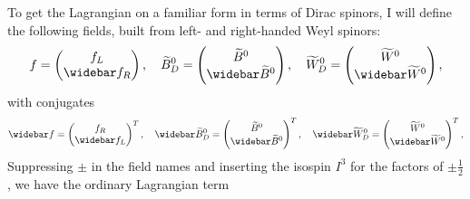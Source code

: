 \documentclass[english, notitlepage]{article}
\begin{document}
            To get the Lagrangian on a familiar form in terms of Dirac spinors, I will
            define the following fields, built from left- and right-handed Weyl spinors:
            \begin{align}
                f = \begin{pmatrix}
                        f_L \\ \wbar{f}_R
                    \end{pmatrix},\quad \wtilde{B}^0_D = \begin{pmatrix}
                                                             \wtilde{B}^0 \\ \wbar{\wtilde{B}}^0
                                                         \end{pmatrix},\quad \wtilde{W}^0_D = \begin{pmatrix}
                                                                                                  \wtilde{W}^0 \\ \wbar{\wtilde{W}}^0
                                                                                              \end{pmatrix},
            \end{align}
            with conjugates
            \begin{align}
                \wbar{f} = \begin{pmatrix}
                               f_R \\ \wbar{f}_L
                           \end{pmatrix}^T,\quad \wbar{\wtilde{B}}^0_D = \begin{pmatrix}
                                                                             \wtilde{B}^0 \\ \wbar{\wtilde{B}}^0
                                                                         \end{pmatrix}^T,\quad \wbar{\wtilde{W}}^0_D = \begin{pmatrix}
                                                                                                                           \wtilde{W}^0 \\ \wbar{\wtilde{W}}^0
                                                                                                                       \end{pmatrix}^T,
            \end{align}
            Suppressing $\pm$ in the field names and inserting the isospin $I^3$ for the factors of $\pm\frac{1}{2}$, we have the ordinary Lagrangian term
\end{document}
